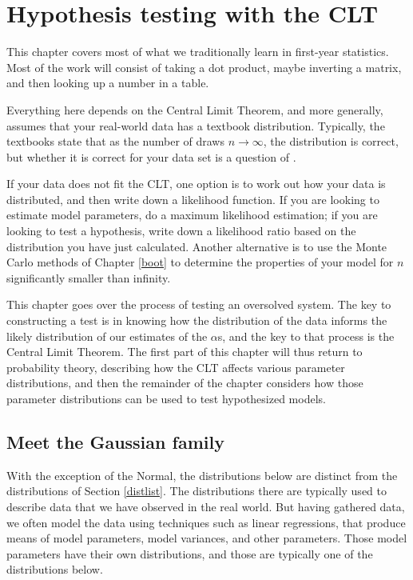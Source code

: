 \chapter[Gaussian tricks]{Hypothesis testing with the CLT} \label{testing} \label{gauss}

This chapter covers most of what we traditionally learn in first-year statistics. 
 Most of the work will consist of taking a dot product, maybe inverting a matrix,
and then looking up a number in a table. 

Everything here depends on the Central Limit Theorem, and more
generally, assumes that your real-world data has a textbook
distribution. Typically, the textbooks state that as the number of draws
$n \to \infty$, the distribution is correct, but whether it is correct
for your data set is a question of .

If your data does not fit the CLT, one option is to work out how your data
is distributed, and then write down a likelihood function. If you are
looking to estimate model parameters, do a maximum likelihood estimation;
if you are looking to test a hypothesis, write down a likelihood ratio
based on the distribution you have just calculated.  Another alternative
is to use the Monte Carlo methods of Chapter \ref{boot} to determine
the properties of your model for $n$ significantly smaller than infinity.

This chapter goes over the process of testing an oversolved system. The
key to constructing a test is in knowing how the distribution of the
data informs the likely distribution of our estimates of the $\alpha$s,
and the key to that process is the Central Limit Theorem. The first part
of this chapter will thus return to probability theory, describing how
the CLT affects various parameter distributions, and then the remainder
of the chapter considers how those parameter distributions can be used
to test hypothesized models.

\section{Meet the Gaussian family} \label{dist2}
With the exception of the Normal, the distributions below are distinct
from the distributions of Section \ref{distlist}. The distributions
there
are typically used to describe data that we have observed in the real
world. But having gathered data, we often model the data using techniques
such as linear regressions, that produce means of model parameters,
model variances, and other parameters. Those model parameters have their
own distributions, and those are typically one of the distributions below.


